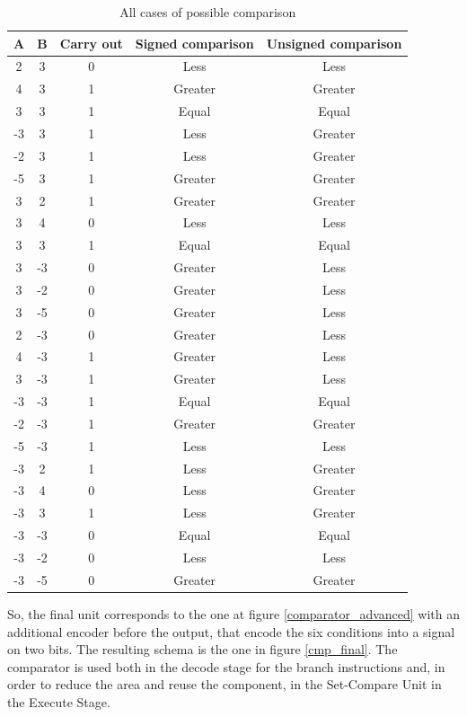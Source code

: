\begin{table}[H]
  \centering
  \begin{tabular}{c|c|c|c|c}
      \textbf{A} & \textbf{B} & \textbf{Carry out} & \textbf{Signed comparison} & \textbf{Unsigned comparison} \\
      \hline
      2 & 3 & 0 & Less & Less \\
      4 & 3 & 1 & Greater & Greater \\
      3 & 3 & 1 & Equal & Equal \\
      \rowcolor{red!50}
      -3 & 3 & 1 & Less & Greater \\
      \rowcolor{red!50}
      -2 & 3 & 1 & Less & Greater \\
      \rowcolor{red!50}
      -5 & 3 & 1 & Greater & Greater \\
      \hline
      3 & 2 & 1 & Greater & Greater \\
      3 & 4 & 0 & Less & Less \\
      3 & 3 & 1 & Equal & Equal \\
      \rowcolor{red!50}
      3 & -3 & 0 & Greater & Less \\
      \rowcolor{red!50}
      3 & -2 & 0 & Greater & Less \\
      \rowcolor{red!50}
      3 & -5 & 0 & Greater & Less \\
      \hline
      \rowcolor{red!50}
      2 & -3 & 0 & Greater & Less \\
      \rowcolor{red!50}
      4 & -3 & 1 & Greater & Less \\
      \rowcolor{red!50}
      3 & -3 & 1 & Greater & Less \\
      -3 & -3 & 1 & Equal & Equal \\
      -2 & -3 & 1 & Greater & Greater \\
      -5 & -3 & 1 & Less & Less \\
      \hline
      \rowcolor{red!50}
      -3 & 2 & 1 & Less & Greater \\
      \rowcolor{red!50}
      -3 & 4 & 0 & Less & Greater \\
      \rowcolor{red!50}
      -3 & 3 & 1 & Less & Greater \\
      -3 & -3 & 0 & Equal & Equal \\
      -3 & -2 & 0 & Less & Less \\
      -3 & -5 & 0 & Greater & Greater \\
  \end{tabular}
  \caption{All cases of possible comparison}
  \label{comparator_cases}
\end{table}
So, the final unit corresponds to the one at figure \ref{comparator_advanced} with an additional encoder before the output, that encode the six conditions into a signal on two bits. The resulting schema is the one in figure \ref{cmp_final}. The comparator is used both in the decode stage for the branch instructions and, in order to reduce the area and reuse the component, in the Set-Compare Unit in the Execute Stage.

